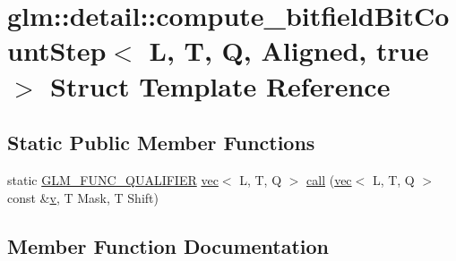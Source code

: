 \hypertarget{structglm_1_1detail_1_1compute__bitfield_bit_count_step_3_01_l_00_01_t_00_01_q_00_01_aligned_00_01true_01_4}{}\section{glm\+:\+:detail\+:\+:compute\+\_\+bitfield\+Bit\+Count\+Step$<$ L, T, Q, Aligned, true $>$ Struct Template Reference}
\label{structglm_1_1detail_1_1compute__bitfield_bit_count_step_3_01_l_00_01_t_00_01_q_00_01_aligned_00_01true_01_4}
\subsection*{Static Public Member Functions}
\begin{DoxyCompactItemize}
\item 
static \hyperlink{setup_8hpp_a33fdea6f91c5f834105f7415e2a64407}{G\+L\+M\+\_\+\+F\+U\+N\+C\+\_\+\+Q\+U\+A\+L\+I\+F\+I\+ER} \hyperlink{structglm_1_1vec}{vec}$<$ L, T, Q $>$ \hyperlink{structglm_1_1detail_1_1compute__bitfield_bit_count_step_3_01_l_00_01_t_00_01_q_00_01_aligned_00_01true_01_4_a8edab4daff7f1593b8c211b5b64aff24}{call} (\hyperlink{structglm_1_1vec}{vec}$<$ L, T, Q $>$ const \&\hyperlink{_s_d_l__opengl_8h_a10a82eabcb59d2fcd74acee063775f90}{v}, T Mask, T Shift)
\end{DoxyCompactItemize}


\subsection{Member Function Documentation}
\mbox{\label{structglm_1_1detail_1_1compute__bitfield_bit_count_step_3_01_l_00_01_t_00_01_q_00_01_aligned_00_01true_01_4_a8edab4daff7f1593b8c211b5b64aff24}} 
